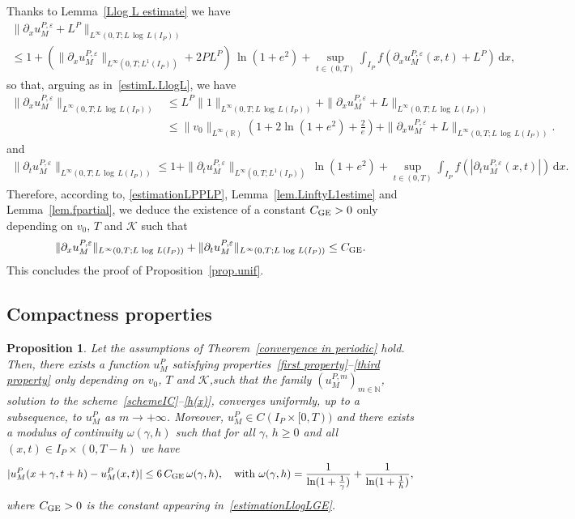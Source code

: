 \documentclass[11pt]{amsart}
\newtheorem{proposition}{Proposition}
\newcommand{\K}{\mathcal{K}}
\newcommand{\dd}{\mathrm{d}}
\newcommand{\pa}{\partial}
\newcommand{\R}{\mathbb{R}}
\newcommand{\N}{\mathbb{N}}
\newcommand{\eps}{\varepsilon}
\begin{document}
Thanks to Lemma~\ref{Llog L estimate} we have
\begin{multline*}
    \|\pa_x u^{P,\eps}_M+L^P\|_{L^\infty(0,T;L\,\log\,L(I_P))} \\ \leq 1 + \left(\|\pa_x u^{P,\eps}_M\|_{L^\infty(0,T;L^1(I_P))} + 2P L^P\right) \, \ln(1+e^2) + \sup_{t \in (0,T)} \int_{I_P} f\left(\pa_x u^{P,\eps}_M(x,t)+L^P\right) \, \dd x,
\end{multline*}
so that, arguing as in~\eqref{estimL.LlogL}, we have
\begin{align}\label{aux.conv}
    \|\pa_x u^{P,\eps}_M\|_{L^\infty(0,T;L\,\log\,L(I_P))} &\leq L^P\|1\|_{L^\infty(0,T;L\,\log\,L(I_P))} + \|\pa_x u^{P,\eps}_M+L\|_{L^\infty(0,T;L\,\log\,L(I_P))}\\
    &\leq  \|v_0\|_{L^\infty(\R)}\left(1+2\ln(1+e^2)+\frac{2}{e}\right) + \|\pa_x u^{P,\eps}_M+L\|_{L^\infty(0,T;L\,\log\,L(I_P))}.\nonumber
\end{align}
and
\begin{multline*}
    \|\pa_t u^{P,\eps}_M\|_{L^\infty(0,T;L\,\log\,L(I_P))}  \leq 1 + \|\pa_t u^{P,\eps}_M\|_{L^\infty(0,T;L^1(I_P))}  \, \ln(1+e^2) + \sup_{t \in (0,T)} \int_{I_P} f\left(\left|\pa_t u^{P,\eps}_M(x,t)\right|\right) \, \dd x.
\end{multline*}
Therefore, according to, \eqref{estimationLPPLP}, Lemma~\ref{lem.LinftyL1estime} and Lemma~\ref{lem.fpartial}, we deduce the existence of a constant ${C}_{\rm GE}>0$ only depending on $v_0$, $T$ and $\K$ such that
\begin{align*}
    \|\pa_x u^{P,\eps}_M\|_{L^\infty(0,T;L\,\log\,L(I_P))} + \|\pa_t u^{P,\eps}_M\|_{L^\infty(0,T;L\,\log\,L(I_P))} \leq {C}_{\rm GE}.
\end{align*}
This concludes the proof of Proposition~\ref{prop.unif}.



\subsection{Compactness properties}

\begin{proposition}\label{prop.compactness}
Let the assumptions of Theorem~\ref{convergence in periodic} hold. Then, there exists a function $u^P_M$ satisfying properties~\eqref{first property}--\eqref{third property} only depending on $v_0$, $T$ and $\K$,such that the family $(u^{P,m}_M)_{m\in \N}$, solution to the scheme~\eqref{schemeIC}--\eqref{h(x)}, converges uniformly, up to a subsequence, to $u^P_M$ as $m\to+\infty$. Moreover, $u^P_M \in C(I_P\times[0,T))$ and there exists a modulus of continuity $\omega(\gamma,h)$ such that for all $\gamma, \,h\geq 0$ and all $(x,t) \in I_P \times (0,T-h)$ we have
    \begin{align}\label{mod-continuite}
|u^P_M (x + \gamma,t+h) - u^P_M (x,t)| \leq 6 \,C_{\rm GE}\, \omega(\gamma,h), \quad \mbox{with } \omega(\gamma, h) =\frac{1}{\ln(1+ \frac{1}{\gamma})}+ \frac{1}{\ln(1 + \frac{1}{h})},
\end{align}
where $C_{\rm GE}>0$ is the constant appearing in~\eqref{estimationLlogLGE}.
\end{proposition}
\end{document}
